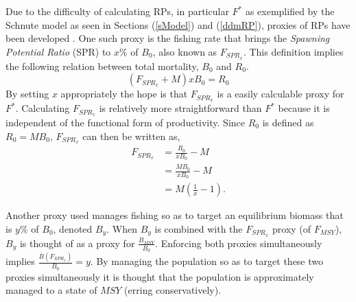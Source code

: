 

%
Due to the difficulty of calculating RPs, in particular $F^*$ as exemplified 
by the Schnute model as seen in Sections (\ref{sModel}) and (\ref{ddmRP}), proxies of RPs
have been developed \cite{clark_groundfish_1991, mace_relationships_1994, clark_f_2002}.
One such proxy is the fishing rate that brings the {\it Spawning Potential Ratio} (SPR) 
to $x\%$ of $B_0$, also known as $F_{SPR_x}$.
%
This definition implies the following relation between total mortality, $B_0$ and $R_0$.
%
\begin{equation}
	(F_{SPR_x}+M)x B_0 = R_0 \nonumber
\end{equation}
%
By setting $x$ appropriately the hope is that $F_{SPR_x}$ is a easily calculable proxy %
for $F^*$. Calculating $F_{SPR_x}$ is relatively more straightforward than $F^*$ 
because it is independent of the %
functional form of productivity. Since $R_0$ is defined as $R_0=M B_0$, $F_{SPR_x}$ 
can then be written as,
%
\begin{align}
F_{SPR_x} &= \frac{R_0}{x B_0}-M \nonumber\\
	&= \frac{M B_0}{x B_0}-M \nonumber\\ 
	&= M\left(\frac{1}{x}-1\right)\label{fspr}.
\end{align}


Another proxy used manages fishing so as to target an equilibrium biomass 
that is $y\%$ of $B_0$, denoted $B_y$. 
When $B_y$ is combined with the $F_{SPR_x}$ proxy (of $F_{MSY}$), $B_y$ is 
thought of as a proxy for $\frac{B_{MSY}}{B_0}$. Enforcing both %
proxies simultaneously implies $\frac{\bar B(F_{SPR_x})}{B_0}=y$. By managing
the population so as to target these two proxies simultaneously it is thought 
that the population is approximately managed to a state of $MSY$ (erring conservatively). 

